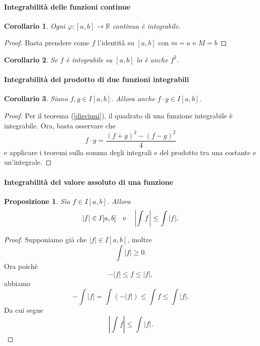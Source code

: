 \documentclass{article}
\theoremstyle{plain}
\newtheorem{prop}[thm]{Proposizione}
\newtheorem{cor}{Corollario}
\theoremstyle{definition}
\theoremstyle{remark}
\begin{document}
\paragraph{Integrabilità delle funzioni continue}
\begin{bxthm}
\begin{cor}
    Ogni $\varphi:[a,b]\to\mathbb{R}$ continua è integrabile.
\end{cor}
\end{bxthm}
\begin{proof}
    Basta prendere come $f$ l'identità su $[a,b]$ con $m=a$ e $M=b$
\end{proof}

\vspace{10pt}

\begin{bxthm}
\begin{cor}
    Se $f$ è integrabile su $[a,b]$ lo è anche $f^2$.
\end{cor}
\end{bxthm}

\vspace{10pt}

\paragraph{Integrabilità del prodotto di due funzioni integrabili}
\begin{bxthm}
\begin{cor}
    Siano $f,g\in I[a,b]$. Allora anche $f\cdot g\in I[a,b]$.
\end{cor}
\end{bxthm}
\begin{proof}
    Per il teorema (\ref{dieciuni}), il quadrato di una funzione integrabile è integrabile. 
    Ora, basta osservare che 
    \[f\cdot g=\dfrac{(f+g)^2-(f-g)^2}{4}\]
    e applicare i teoremi sulla somma degli integrali e del prodotto tra una costante e un'integrale.
\end{proof}

\vspace{10pt}

\paragraph{Integrabilità del valore assoluto di una funzione}
\begin{bxthm}
\begin{prop}\label{trecinq}
    Sia $f\in I[a,b]$. Allora 
    \[|f|\in I[a,b]\quad\textup{e}\quad\left|\int f\right|\leq\int|f|.\]
\end{prop}
\end{bxthm}
\begin{proof}
    Supponiamo già che $|f|\in I[a,b]$, inoltre 
    \[\int|f|\geq0.\]
    Ora poichè 
    \[-|f|\leq f\leq |f|,\] 
    abbiamo 
    \[-\int|f|=\int(-|f|)\leq\int f\leq \int |f|.\]
    Da cui segue 
    \[\left|\int f\right|\leq \int|f|.\]
\end{proof}
\end{document}
